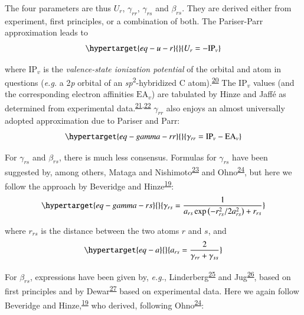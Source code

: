 \documentclass[
  number,
  3p]{elsarticle}
\begin{document}
The four parameters are thus \(U_{r}\), \(\gamma_{rr}\), \(\gamma_{rs}\)
and \(\beta_{rs}\). They are derived either from experiment, first
principles, or a combination of both. The Pariser-Parr approximation
leads to \begin{equation}\protect\hypertarget{eq-u-r}{}{
U_{r} = - \mathrm{IP}_v
}\label{eq-u-r}\end{equation}

where \(\mathrm{IP}_v\) is the \emph{valence-state ionization potential}
of the orbital and atom in questions (\emph{e.g.} a 2\emph{p} orbital of
an \emph{sp}\textsuperscript{2}-hybridized C
atom).\textsuperscript{\protect\hyperlink{ref-mullikenNewElectroaffinityScale1934}{20}}
The \(\mathrm{IP}_v\) values (and the corresponding electron affinities
\(\mathrm{EA}_v\)) are tabulated by Hinze and Jaffé as determined from
experimental
data.\textsuperscript{\protect\hyperlink{ref-hinzeElectronegativity1962}{21},\protect\hyperlink{ref-hinzeElectronegativityOrbitalElectronegativity1962}{22}}
\(\gamma_{rr}\) also enjoys an almost universally adopted approximation
due to Pariser and Parr:
\begin{equation}\protect\hypertarget{eq-gamma-rr}{}{
\gamma_{rr} = \mathrm{IP}_v - \mathrm{EA}_v
}\label{eq-gamma-rr}\end{equation}

For \(\gamma_{rs}\) and \(\beta_{rs}\), there is much less consensus.
Formulas for \(\gamma_{rs}\) have been suggested by, among others,
Mataga and
Nishimoto\textsuperscript{\protect\hyperlink{ref-matagaElectronicStructureSpectra1957}{23}}
and
Ohno\textsuperscript{\protect\hyperlink{ref-ohnoRemarksPariserParrPopleMethod1964}{24}},
but here we follow the approach by Beveridge and
Hinze\textsuperscript{\protect\hyperlink{ref-beveridgeParametrizationSemiempiricalPi1971}{19}}:
\begin{equation}\protect\hypertarget{eq-gamma-rs}{}{
\gamma_{rs} = \frac{1}{a_{rs} \exp{\left( -r_{rs}^2/2a_{rs}^2\right)} + r_{rs}}
}\label{eq-gamma-rs}\end{equation}

where \(r_{rs}\) is the distance between the two atoms \(r\) and \(s\),
and \begin{equation}\protect\hypertarget{eq-a}{}{
a_{rs} = \frac{2}{\gamma_{rr} + \gamma_{ss}}
}\label{eq-a}\end{equation}

For \(\beta_{rs}\), expressions have been given by, \emph{e.g.},
Linderberg\textsuperscript{\protect\hyperlink{ref-linderbergConsistencyRequirementPariserParrPople1967}{25}}
and
Jug\textsuperscript{\protect\hyperlink{ref-jugOperatorEquationsApproximate1972}{26}},
based on first principles and by
Dewar\textsuperscript{\protect\hyperlink{ref-chungGroundStatesConjugated1965}{27}}
based on experimental data. Here we again follow Beveridge and
Hinze,\textsuperscript{\protect\hyperlink{ref-beveridgeParametrizationSemiempiricalPi1971}{19}}
who derived, following
Ohno\textsuperscript{\protect\hyperlink{ref-ohnoRemarksPariserParrPopleMethod1964}{24}}:
\end{document}
